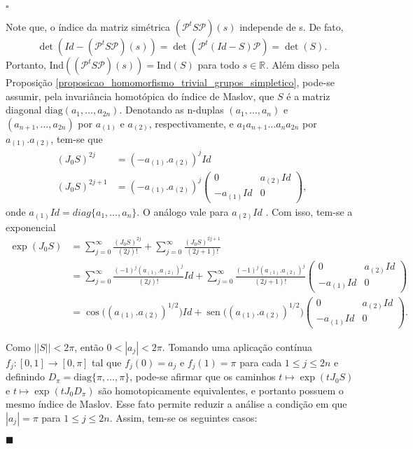 \documentclass[12pt]{book}
\newenvironment{prova}[1]{$\square$ #1}{\hfill$\blacksquare$}
\DeclareMathOperator{\sen}{sen}
\newcommand{\diag}{\text{diag}}
\newcommand{\estruturacomplexa}{J_{0}}
\newcommand{\ind}{\text{Ind}}
\newcommand{\intervalo}{[0,1]}
\newcommand{\norma}[1]{||#1||}
\newcommand{\real}[1]{\mathbb{R}^{#1}}
\newcommand{\reta}{\real{}}
\begin{document}
\begin{prova}
\begin{enumerate}
			Note que, o índice da matriz simétrica $(\mathcal{P}^{t}S\mathcal{P})(s)$ independe de s. De fato, 
			$$
			\det(Id-(\mathcal{P}^{t}S\mathcal{P})(s)) = 			\det(\mathcal{P}^{t}(Id-S)\mathcal{P}) = \det(S).
			$$ 
			Portanto, $\ind((\mathcal{P}^{t}S\mathcal{P})(s)) = \ind(S)$ para todo $s \in \reta$. Além disso pela Proposição \ref{proposicao_homomorfismo_trivial_grupos_simpletico}, pode-se assumir, pela invariância homotópica do índice de Maslov, que $S$ é a matriz diagonal $\diag(a_{1},\dots,a_{2n})$. Denotando as n-duplas $(a_{1}, \dots, a_{n})$ e $(a_{n+1}, \dots, a_{2n})$ por $a_{(1)}$ e $a_{(2)}$, respectivamente, e $a_{1}a_{n+1}\dots a_{n}a_{2n}$ por $a_{(1)}.a_{(2)}$, tem-se que
			$$
			\begin{aligned}
			(\estruturacomplexa S)^{2j} &=(-a_{(1)}.a_{(2)})^{j} Id
			\\
			(\estruturacomplexa S)^{2j+1} 
			&= (-a_{(1)}.a_{(2)})^{j} 
			\left(
			\begin{array}{cc}
			0 & a_{(2)}Id
			\\
			-a_{(1)}Id & 0  
			\end{array}
			\right),
			\end{aligned}
			$$
			onde $a_{(1)}Id=diag\{a_{1}, \dots, a_{n}\}$. O análogo vale para $a_{(2)}Id$ . Com isso, tem-se a exponencial
			$$
			\begin{aligned}
			\exp(\estruturacomplexa S) &= \sum_{j=0}^{\infty}\frac{(\estruturacomplexa S)^{2j}}{(2j)!} + \sum_{j=0}^{\infty} \frac{(\estruturacomplexa S)^{2j+1}}{(2j+1)!}
			\\
			&= \sum_{j=0}^{\infty}\frac{(-1)^{j}(a_{(1)}.a_{(2)})^{j}}{(2j)!}Id + \sum_{j=0}^{\infty} \frac{(-1)^{j}(a_{(1)}.a_{(2)})^{j}}{(2j+1)!}	\left(
			\begin{array}{cc}
			0 & a_{(2)}Id
			\\
			-a_{(1)}Id & 0  
			\end{array}
			\right)
			\\
			&= \cos\big((a_{(1)}.a_{(2)})^{1/2}\big)Id +\sen\big((a_{(1)}.a_{(2)})^{1/2}\big)
			\left(
			\begin{array}{cc}
			0 & a_{(2)}Id
			\\
			-a_{(1)}Id & 0  
			\end{array}
			\right).
			\end{aligned}
			$$


			Como $\norma{S}<2\pi$, então $0<|a_{j}|<2\pi$. Tomando uma aplicação contínua $f_{j}:\intervalo \to [0,\pi]$ tal que $f_{j}(0) = a_{j}$ e $f_{j}(1) = \pi$ para cada $1\leq j \leq 2n$ e definindo $D_{\pi} = \diag\{\pi, \dots, \pi\}$, pode-se afirmar que os caminhos $t\mapsto \exp(t\estruturacomplexa S)$ e $t\mapsto \exp(t\estruturacomplexa D_{\pi})$ são homotopicamente equivalentes, e portanto possuem o mesmo índice de Maslov. Esse fato  permite reduzir a análise a condição em que $|a_{j}|=\pi$ para $1\leq j\leq 2n$. Assim, tem-se os seguintes casos:
			

\end{enumerate}
\end{prova}
\end{document}
